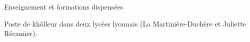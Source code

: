 \begin{rubric}{Enseignement et formations dispensées}
                                \entry*[2017-2018]
                                
                            Poste de khôlleur dans deux lycées lyonnais (La Martinière-Duchère et
                        Juliette Récamier).
                    \end{rubric}


